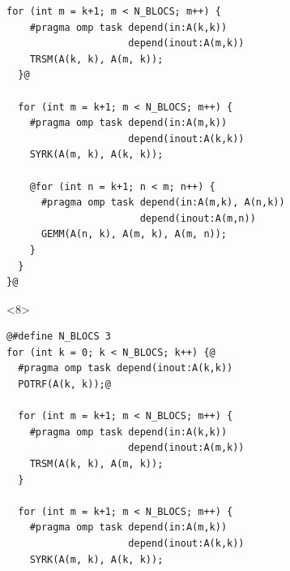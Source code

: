 \documentclass[xcolor={usenames,dvipsnames,svgnames,table}, aspectratio=43]{beamer}
\begin{document}
\begin{frame}[fragile]
\begin{minipage}[t]{0.52\linewidth}
\begin{onlyenv}
\begin{lstlisting}[style=transparency]
  for (int m = k+1; m < N_BLOCS; m++) {
    #pragma omp task depend(in:A(k,k))
                     depend(inout:A(m,k))
    TRSM(A(k, k), A(m, k));
  }@

  for (int m = k+1; m < N_BLOCS; m++) {
    #pragma omp task depend(in:A(m,k))
                     depend(inout:A(k,k))
    SYRK(A(m, k), A(k, k));

    @for (int n = k+1; n < m; n++) {
      #pragma omp task depend(in:A(m,k), A(n,k))
                       depend(inout:A(m,n))
      GEMM(A(n, k), A(m, k), A(m, n));
    }
  }
}@
  \end{lstlisting}
\end{onlyenv}
  \begin{onlyenv}<8>
  \begin{lstlisting}[style=transparency]
@#define N_BLOCS 3
for (int k = 0; k < N_BLOCS; k++) {@
  #pragma omp task depend(inout:A(k,k))
  POTRF(A(k, k));@

  for (int m = k+1; m < N_BLOCS; m++) {
    #pragma omp task depend(in:A(k,k))
                     depend(inout:A(m,k))
    TRSM(A(k, k), A(m, k));
  }

  for (int m = k+1; m < N_BLOCS; m++) {
    #pragma omp task depend(in:A(m,k))
                     depend(inout:A(k,k))
    SYRK(A(m, k), A(k, k));


\end{lstlisting}
\end{onlyenv}
\end{minipage}
\end{frame}
\end{document}
